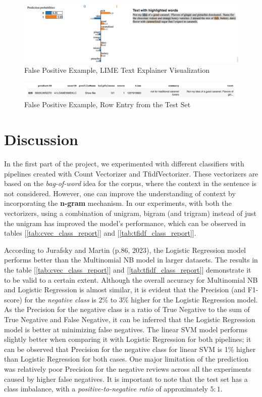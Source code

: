 \documentclass[11pt]{article}
\begin{document}
\begin{figure}
    \centering
    \includegraphics[scale=0.4]{figures/fp4.png}
    \caption{False Positive Example, LIME Text Explainer Visualization}
    \label{fig:fp4}
\end{figure}
\begin{figure}
    \centering
    \includegraphics[scale=0.4]{figures/fp4_row.png}
    \caption{False Positive Example, Row Entry from the Test Set}
    \label{fig:fp4_row}
\end{figure}
 \section{Discussion}

In the first part of the project, we experimented with different classifiers with pipelines created with Count Vectorizer and TfidfVectorizer. These vectorizers are based on the \textit{bag-of-word} idea for the corpus, where the context in the sentence is not considered. However, one can improve the understanding of context by incorporating the \textbf{n-gram} mechanism. In our experiments, with both the vectorizers, using a combination of unigram, bigram (and trigram) instead of just the unigram has improved the model's performance, which can be observed in tables  [\ref{tab:cvec_class_report}] and  [\ref{tab:tfidf_class_report}].

According to Jurafsky and Martin (p.86, 2023), the Logistic Regression model performs better than the Multinomial NB model in larger datasets. The results in the table [\ref{tab:cvec_class_report}] and [\ref{tab:tfidf_class_report}] demonstrate it to be valid to a certain extent. Although the overall accuracy for Multinomial NB and Logistic Regression is almost similar, it is evident that the Precision (and F1-score) for the \textit{negative class} is 2\% to 3\% higher for the Logistic Regression model. As the Precision for the negative class is a ratio of True Negative to the sum of True Negative and False Negative, it can be inferred that the Logistic Regression model is better at minimizing false negatives. The linear SVM model performs slightly better when comparing it with Logistic Regression for both pipelines; it can be observed that Precision for the negative class for linear SVM is 1\% higher than Logistic Regression for both cases. One major limitation of the prediction was relatively poor Precision for the negative reviews across all the experiments caused by higher false negatives. It is important to note that the test set has a class imbalance, with a \textit{positive-to-negative ratio} of approximately \textbf{$5:1$}.
\end{document}
